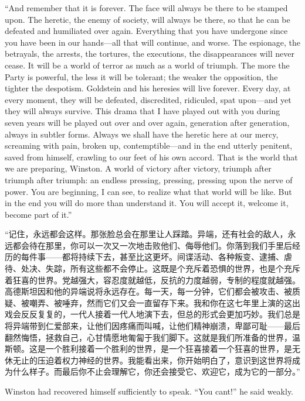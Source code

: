 \begin{paracol}{2}
``And remember that it is forever. The face will always be there to be
stamped upon. The heretic, the enemy of society, will always be there,
so that he can be defeated and humiliated over again. Everything that
you have undergone since you have been in our hands---all that will
continue, and worse. The espionage, the betrayals, the arrests, the
tortures, the executions, the disappearances will never cease. It will
be a world of terror as much as a world of triumph. The more the Party
is powerful, the less it will be tolerant; the weaker the opposition,
the tighter the despotism. Goldstein and his heresies will live forever.
Every day, at every moment, they will be defeated, discredited,
ridiculed, spat upon---and yet they will always survive. This drama that
I have played out with you during seven years will be played out over
and over again, generation after generation, always in subtler forms.
Always we shall have the heretic here at our mercy, screaming with pain,
broken up, contemptible---and in the end utterly penitent, saved from
himself, crawling to our feet of his own accord. That is the world that
we are preparing, Winston. A world of victory after victory, triumph
after triumph after triumph: an endless pressing, pressing, pressing
upon the nerve of power. You are beginning, I can see, to realize what
that world will be like. But in the end you will do more than understand
it. You will accept it, welcome it, become part of it.''

\switchcolumn

``记住，永远都会这样。那张脸总会在那里让人踩踏。异端，还有社会的敌人，永远都会待在那里，你可以一次又一次地击败他们、侮辱他们。你落到我们手里后经历的每件事——都将持续下去，甚至比这更坏。间谍活动、各种叛变、逮捕、虐待、处决、失踪，所有这些都不会停止。这既是个充斥着恐惧的世界，也是个充斥着狂喜的世界。党越强大，容忍度就越低，反抗的力度越弱，专制的程度就越强。高德斯坦因和他的异端说将永远存在。每一天，每一分钟，它们都会被攻击、被质疑、被嘲弄、被唾弃，然而它们又会一直留存下来。我和你在这七年里上演的这出戏会反反复复的，一代人接着一代人地演下去，但总的形式会更加巧妙。我们总是将异端带到仁爱部来，让他们因疼痛而叫喊，让他们精神崩溃，卑鄙可耻——最后翻然悔悟，拯救自己，心甘情愿地匍匐于我们脚下。这就是我们所准备的世界，温斯顿。这是一个胜利接着一个胜利的世界，是一个狂喜接着一个狂喜的世界，是无休无止的压迫着权力神经的世界。我能看出来，你开始明白了，意识到这世界将成为什么样子。而最后你不止会理解它，你还会接受它、欢迎它，成为它的一部分。''

\switchcolumn*

Winston had recovered himself sufficiently to speak. ``You
can\textquotesingle t!'' he said weakly.


\end{paracol}
